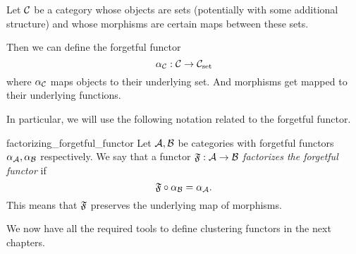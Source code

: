 \begin{definition}{}{}
Let $\mathcal{C}$ be a category whose objects are sets (potentially with some additional structure) and whose morphisms are certain maps between these sets.

Then we can define the forgetful functor
$$
\alpha_{\mathcal{C}}: \mathcal{C} \to \mathcal{C}_\mathrm{set}
$$
where $\alpha_{\mathcal{C}}$ maps objects to their underlying set. And morphisms get mapped to their underlying functions.
\end{definition}

In particular, we will use the following notation related to the forgetful functor.

\begin{notation}{}{factorizing_forgetful_functor}
Let $\mathcal{A}, \mathcal{B}$ be categories with forgetful functors $\alpha_{\mathcal{A}}, \alpha_{\mathcal{B}}$ respectively. We say that a functor $\mathfrak{F}: \mathcal{A} \to \mathcal{B}$ \emph{factorizes the forgetful functor} if
\begin{equation*}
    \mathfrak{F} \circ \alpha_{\mathcal{B}} = \alpha_{\mathcal{A}}.
\end{equation*}
This means that $\mathfrak{F}$ preserves the underlying map of morphisms.
\end{notation}

\medskip We now have all the required tools to define clustering functors in the next chapters.
